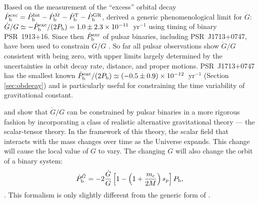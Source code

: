 Based on the measurement of the ``excess'' orbital decay 
$\dot{P}_{\rm b}^{\rm exc}=\dot{P}_{\rm b}^{\rm Int} - \dot{P}_{\rm
b}^{\dot{M}}  - \dot{P}_{\rm b}^{\rm T} - \dot{P}_{\rm b}^{\rm GR}$,
\citet{dgt88} derived a generic phenomenological limit for $\dot{G}$: 
$\dot{G}/G\simeq-\dot{P}_{\rm b}^{\rm exc}/(2P_{\rm
b})=1.0\pm2.3\times10^{-11}$~yr$^{-1}$ using timing of binary PSR~1913+16. 
Since then $\dot{P}_{\rm b}^{\rm exc}$ of pulsar binaries, including 
PSR~J1713+0747, have been used to 
constrain $\dot{G}/G$ \citep{ktr94, nss+05, lwj+09, fwe+12}. 
So far all pulsar observations show $\dot{G}/G$ consistent with being zero, with 
upper limits largely determined by the uncertainties in orbit decay rate, distance, 
and proper motions.
PSR~J1713+0747 has the smallest known $\dot{P}_{\rm b}^{\rm exc}/(2P_{\rm
b})\simeq(-0.5\pm0.9)\times10^{-12}$~yr$^{-1}$ (Section \ref{sec:obdecay}) and is
particularly useful for constraining the time variability of gravitational
constant.

\citealt{lwj+09} and \citealt{fwe+12} show that $\dot{G}/G$ can be constrained by pulsar
binaries in a more rigorous fashion
by incorporating a class of realistic alternative gravitational theory --- the 
scalar-tensor theory.
In the framework of this theory,
the scalar field that interacts with the mass changes over time as the
Universe expands. This change will cause the local value of
$G$ to vary. The changing $G$ will also change
the orbit of a binary system:
\begin{equation}
\dot{P}_{\rm b}^{\dot{G}} = -2 \frac{\dot{G}}{G}
\left[1-\left( 1+\frac{m_c}{2M}\right) s_p\right]P_{\rm b},
\end{equation} \citep{nor90}.
This formalism is only slightly different from the generic form of
\citet{dgt88}.


